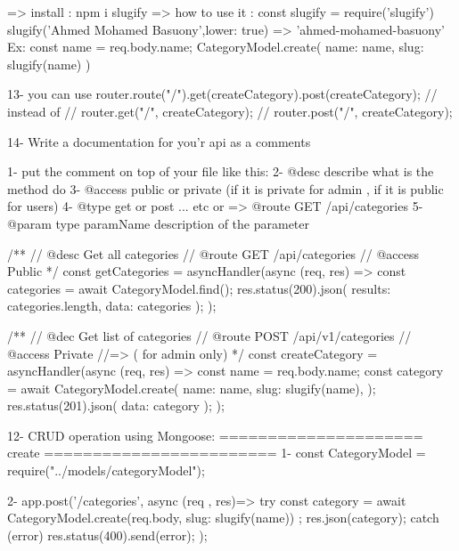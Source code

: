     => install : npm i slugify 
    => how to use it : 
                        const slugify = require('slugify')
                        slugify('Ahmed Mohamed  Basuony',{lower: true}) 
                         => 'ahmed-mohamed-basuony'
                        Ex:  const name = req.body.name;   
                             CategoryModel.create({ name: name, slug: slugify(name) })


13- you can use 
            router.route("/").get(createCategory).post(createCategory);
            // instead of
            // router.get("/", createCategory);
            // router.post("/", createCategory);



14- Write a documentation for you'r api as a comments

        1- put the comment on top of your file like this:
        2- @desc  describe what is the method do
        3- @access public or private  (if it is private for admin , if it is public for users)
        4- @type get or post ... etc
            or => @route GET /api/categories
        5- @param {type} paramName description of the parameter

                /**
                // @desc Get all categories
                // @route GET /api/categories
                // @access Public
                */
                const getCategories = asyncHandler(async (req, res) => {
                const categories = await CategoryModel.find({});
                res.status(200).json({ results: categories.length, data: categories });
                });
                    
                /**
                // @dec  Get list of categories
                // @route POST /api/v1/categories
                // @access Private       //=> ( for admin only)
                */
                const createCategory = asyncHandler(async (req, res) => {
                const name = req.body.name;
                const category = await CategoryModel.create({
                    name: name,
                    slug: slugify(name),
                });
                res.status(201).json({ data: category });
                });




12- CRUD operation using Mongoose: 
        ===================== create ========================
        1- const CategoryModel = require("../models/categoryModel");

        2- app.post('/categories', async (req , res)=>{
                try {
                    const category = await CategoryModel.create(req.body, slug: slugify(name)) ;
                    res.json(category);
                } catch (error) {
                    res.status(400).send(error);    
                }
        });

